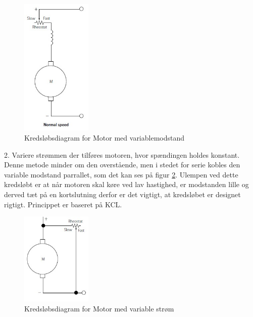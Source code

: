 \begin{figure}[H]
	\centering
	\includegraphics[width=0.3\textwidth]{billeder/Hardware/motormodstand.jpg}
	\caption{Kredsløbsdiagram for Motor med variablemodstand}
	\label{fig:motormodstand}
\end{figure}

2. Variere strømmen der tilføres motoren, hvor spændingen holdes konstant.
Denne metode minder om den overstående, men i stedet for serie kobles den variable modstand parrallet, som det kan ses på figur \ref{fig:motorcurrent}. Ulempen ved dette kredsløbt er at når motoren skal køre ved lav hastighed, er modstanden lille og derved tæt på en kortslutning derfor er det vigtigt, at kredsløbet er designet rigtigt. Princippet er baseret på KCL.

\begin{figure}[H]
	\centering
	\includegraphics[width=0.3\textwidth]{billeder/Hardware/motorcurrent.jpg}
	\caption{Kredsløbsdiagram for Motor med variable strøm}
	\label{fig:motorcurrent}
\end{figure}



